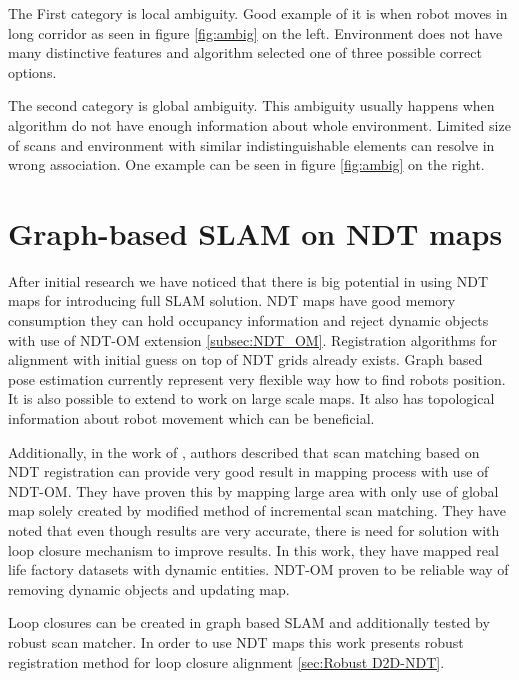 The First category is local ambiguity. Good example of it is when robot moves in long corridor as seen in figure \ref{fig:ambig} on the left. Environment does not have many distinctive features and algorithm selected one of three possible correct options.

The second category is global ambiguity. This ambiguity usually happens when algorithm do not have enough information about whole environment. Limited size of scans and environment with similar indistinguishable elements can resolve in wrong association. One example can be seen in figure \ref{fig:ambig} on the right.   




  
\section {Graph-based SLAM on NDT maps}


After initial research we have noticed that there is big potential in using \gls{NDT} maps for introducing full \gls{SLAM} solution. \gls{NDT} maps have good memory consumption they can hold occupancy information and reject dynamic objects with use of \gls{NDT-OM} extension \ref{subsec:NDT_OM}. Registration algorithms for alignment with initial guess on top of \gls{NDT} grids already exists. Graph based pose estimation currently represent very flexible way how to find robots position. It is also possible to extend to work on large scale maps. It also has topological information about robot movement which can be beneficial. 

Additionally, in the work of \cite{NDTOMFusion}, authors described that scan matching based on \gls{NDT} registration can provide very good result in mapping process with use of \gls{NDT-OM}. They have proven this by mapping large area with only use of global map solely created by modified method of incremental scan matching. They have noted that even though results are very accurate, there is need for solution with loop closure mechanism to improve results. In this work, they have mapped real life factory datasets with dynamic entities. \gls{NDT-OM} proven to be reliable way of removing dynamic objects and updating map.

Loop closures can be created in graph based \gls{SLAM} and additionally tested by robust scan matcher. In order to use \gls{NDT} maps this work presents robust registration method for loop closure alignment \ref{sec:Robust D2D-NDT}. 

